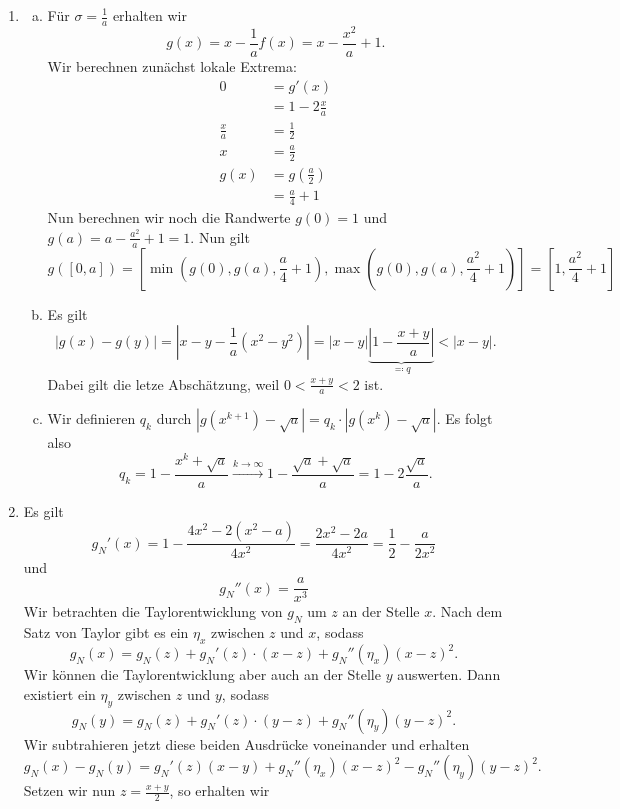 \documentclass{article}
\theoremstyle{definition}
\begin{document}
\begin{enumerate}
    \item \begin{enumerate}[(a)]
        \item Für $\sigma = \frac{1}{a}$ erhalten wir 
        \[g(x) = x-\frac{1}{a}f(x) = x - \frac{x^2}{a} + 1.\]
         Wir berechnen zunächst lokale Extrema:
        \begin{align*}
            0 &= g'(x)\\
            &= 1 - 2\frac{x}{a}\\
            \frac{x}{a} &= \frac{1}{2}\\
            x &= \frac{a}{2}\\
            g(x) &= g(\frac{a}{2})\\
            &= \frac{a}{4} + 1
        \end{align*}
        Nun berechnen wir noch die Randwerte $g(0) = 1$ und $g(a) = a - \frac{a^2}{a} + 1 = 1$. Nun gilt \[
          g([0,a]) = \left[\min(g(0),g(a),\frac{a}{4}+1), \max(g(0),g(a),\frac{a^2}{4}+1)\right] = \left[1,\frac{a^2}{4}+1\right]  
        \]
        \item Es gilt \[|g(x)-g(y)| =  \left| x - y - \frac{1}{a}(x^2 -y^2)\right| = |x-y|\underbrace{\left|1-\frac{x+y}{a}\right|}_{\eqqcolon q} < |x-y|.\] Dabei gilt die letze Abschätzung, weil $0 < \frac{x+y}{a} < 2$ ist.
        \item Wir definieren $q_k$ durch $|g(x^{k+1}) - \sqrt{a}| = q_k \cdot |g(x^{k}) - \sqrt{a}|$. Es folgt also \[q_k = 1-\frac{x^k+\sqrt{a}}{a}\xrightarrow{k\to \infty} 1 - \frac{\sqrt{a} + \sqrt{a}}{a} = 1 - 2\frac{\sqrt{a}}{a}.\]
    \end{enumerate}
    \item Es gilt
    \[
        g_N'(x) = 1 - \frac{4x^2 - 2(x^2-a)}{4x^2} = \frac{2x^2-2a}{4x^2} = \frac{1}{2} - \frac{a}{2x^2}  
    \] und
    \[
        g_N''(x) = \frac{a}{x^3}  
    \]
    Wir betrachten die Taylorentwicklung von $g_N$ um $z$ an der Stelle $x$. Nach dem Satz von Taylor gibt es ein $\eta_x$ zwischen $z$ und $x$, sodass \[
        g_N(x) = g_N(z) + g_N'(z)\cdot (x-z) + g_N''(\eta_x)(x-z)^2.
    \] Wir können die Taylorentwicklung aber auch an der Stelle $y$ auswerten. Dann existiert ein $\eta_y$ zwischen $z$ und $y$, sodass\[
        g_N(y) = g_N(z) + g_N'(z)\cdot (y-z) + g_N''(\eta_y)(y-z)^2.
    \] Wir subtrahieren jetzt diese beiden Ausdrücke voneinander und erhalten
    \[
        g_N(x) - g_N(y) = g_N'(z)(x-y) + g_N''(\eta_x)(x-z)^2 - g_N''(\eta_y)(y-z)^2.
    \]
    Setzen wir nun $z = \frac{x+y}{2}$, so erhalten wir

\end{enumerate}
\end{document}
